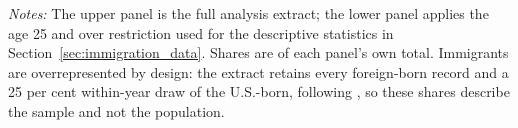 \begin{table}[!htbp]
\centering
\caption{Composition of the Analysis Extract, Before and After the Age Restriction}
\label{tab:extract_composition}
\begin{minipage}{\textwidth}
\footnotesize
\vspace{4pt}
\textit{Notes:} The upper panel is the full analysis extract; the lower panel applies the age 25 and over restriction used for the descriptive statistics in Section~\ref{sec:immigration_data}. Shares are of each panel's own total. Immigrants are overrepresented by design: the extract retains every foreign-born record and a 25 per cent within-year draw of the U.S.-born, following \citet{card2001immigrant}, so these shares describe the sample and not the population.
\end{minipage}
\end{table}
